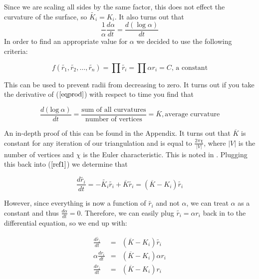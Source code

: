 \documentclass[12pt]{article}
\begin{document}
\noindent Since we are scaling all sides by the same factor, this does not effect the curvature of the surface, so $\tilde{K_i} = K_i$. It also turns out that $$\displaystyle \frac{1}{\alpha} \frac{d\alpha}{dt} = \frac{d(\log \alpha)}{dt}$$ 
 In order to find an appropriate value for $\alpha$ we decided to use the following criteria:
 
\begin{equation}
\label{eqprod}
f(\tilde{r_1},\tilde{r_2},\ldots,\tilde{r_n}) = \prod{\tilde{r_i}} = \prod{\alpha r_i} = C\mbox{, a constant}
\end{equation}

\noindent This can be used to prevent radii from decreasing to zero. It turns out if you take the derivative of ($\ref{eqprod}$) with respect to time you find that 
 
\begin{equation}
\label{proof1}
\frac{d(\mbox{log}~\alpha)}{dt} = \frac{\mbox{sum of all curvatures}}{\mbox{number of vertices}} = \overline{K}, \mbox{average curvature}
\end{equation}
 
\noindent An in-depth proof of this can be found in the Appendix. It turns out that $\overline{K}$ is constant for any iteration of our triangulation and is equal to $\displaystyle\frac{2\pi\chi}{|V|}$, where $|V|$ is the number of vertices and $\chi$ is the Euler characteristic. This is noted in \cite{chowluo}. Plugging this back into ($\ref{ref1}$) we determine that

\begin{equation}
\frac{d\tilde{r_i}}{dt} = -\tilde{K_i}\tilde{r_i} + \overline{K}\tilde{r_i} = (\overline{K} - K_i)\tilde{r_i}
\end{equation}

\noindent However, since everything is now a function of $\tilde{r_i}$ and not $\alpha$, we can treat $\alpha$ as a constant and thus $\displaystyle\frac{d\alpha}{dt} = 0$. Therefore, we can easily plug $\tilde{r_i} = \alpha r_i$ back in to the differential equation, so we end up with:

\begin{eqnarray}
\label{Riccin}
\frac{d\tilde{r_i}}{dt} &=& (\overline{K} - K_i)\tilde{r_i} \nonumber \\
\alpha\frac{dr_i}{dt} &=& (\overline{K} - K_i)\alpha r_i \nonumber \\
\frac{dr_i}{dt} &=& (\overline{K} - K_i)r_i
\end{eqnarray}
\end{document}
